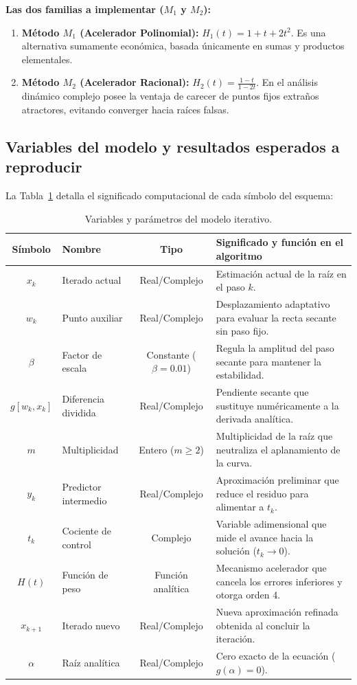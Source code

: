﻿\documentclass[10pt, a4paper]{article}
\begin{document}
\textbf{Las dos familias a implementar ($M_1$ y $M_2$):}
\begin{enumerate}
    \item \textbf{Método $M_1$ (Acelerador Polinomial):} $H_1(t) = 1 + t + 2t^2$. Es una alternativa sumamente económica, basada únicamente en sumas y productos elementales.
    \item \textbf{Método $M_2$ (Acelerador Racional):} $H_2(t) = \frac{1 - t}{1 - 2t}$. En el análisis dinámico complejo posee la ventaja de carecer de puntos fijos extraños atractores, evitando converger hacia raíces falsas.
\end{enumerate}

\subsection{Variables del modelo y resultados esperados a reproducir}
La Tabla~\ref{tab:variables} detalla el significado computacional de cada símbolo del esquema:

\begin{table}[htbp]
    \centering
    \small
    \caption{Variables y parámetros del modelo iterativo.}
    \label{tab:variables}
    \begin{tabularx}{\textwidth}{c p{3.0cm} c X}
        \toprule
        \textbf{Símbolo} & \textbf{Nombre} & \textbf{Tipo} & \textbf{Significado y función en el algoritmo} \\
        \midrule
        $x_k$ & Iterado actual & Real/Complejo & Estimación actual de la raíz en el paso $k$. \\
        $w_k$ & Punto auxiliar & Real/Complejo & Desplazamiento adaptativo para evaluar la recta secante sin paso fijo. \\
        $\beta$ & Factor de escala & Constante ($\beta = 0.01$) & Regula la amplitud del paso secante para mantener la estabilidad. \\
        $g[w_k, x_k]$ & Diferencia dividida & Real/Complejo & Pendiente secante que sustituye numéricamente a la derivada analítica. \\
        $m$ & Multiplicidad & Entero ($m \ge 2$) & Multiplicidad de la raíz que neutraliza el aplanamiento de la curva. \\
        $y_k$ & Predictor intermedio & Real/Complejo & Aproximación preliminar que reduce el residuo para alimentar a $t_k$. \\
        $t_k$ & Cociente de control & Complejo & Variable adimensional que mide el avance hacia la solución ($t_k \to 0$). \\
        $H(t)$ & Función de peso & Función analítica & Mecanismo acelerador que cancela los errores inferiores y otorga orden 4. \\
        $x_{k+1}$ & Iterado nuevo & Real/Complejo & Nueva aproximación refinada obtenida al concluir la iteración. \\
        $\alpha$ & Raíz analítica & Real/Complejo & Cero exacto de la ecuación ($g(\alpha) = 0$). \\
        \bottomrule
    \end{tabularx}
\end{table}
\end{document}
